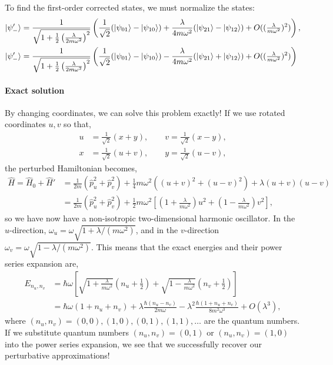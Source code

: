 \documentclass[10pt]{article}
\newcommand{\1}{\mathbf 1}
\begin{document}
To find the first-order corrected states, we must normalize the states:
\begin{align}
	\ket{\psi_-'}
	&=
	\frac{1}{\sqrt{
		1+
		\frac{1}{2}
		\left(
			\frac{\lambda}{2m \omega^2}
		\right)^2
	}}
	\left(
	\frac{1}{\sqrt{2}}
	(
		\ket{\psi_{01}}
		-
		\ket{\psi_{10}}
	)
	+
	\frac{\lambda}{4m \omega^2}
	(
		\ket{\psi_{21}}
		-
		\ket{\psi_{12}}
	)
	+
	O((\tfrac{\lambda}{m \omega^2})^2)
	\right),
	\\
	\ket{\psi_-'}
	&=
	\frac{1}{\sqrt{
		1+
		\frac{1}{2}
		\left(
			\frac{\lambda}{2m \omega^2}
		\right)^2
	}}
	\left(
	\frac{1}{\sqrt{2}}
	(
		\ket{\psi_{01}}
		-
		\ket{\psi_{10}}
	)
	-
	\frac{\lambda}{4m \omega^2}
	(
		\ket{\psi_{21}}
		+
		\ket{\psi_{12}}
	)
	+
	O((\tfrac{\lambda}{m \omega^2})^2)
	\right)
\end{align}


\paragraph{Exact solution}

By changing coordinates, we can solve this problem exactly!
If we use rotated coordinates $u,v$ so that,
\begin{align}
	u &= \frac{1}{\sqrt{2}}(x + y),
	\qquad
	v = \frac{1}{\sqrt{2}}(x - y),
	\\
	x &= \frac{1}{\sqrt{2}}(u + v),
	\qquad
	y = \frac{1}{\sqrt{2}}(u - v),
\end{align}
the perturbed Hamiltonian becomes,
\begin{align}
	\hat H
	=
	\hat H_0
	+
	\hat H'
	&=\nonumber
	\frac{1}{2m} ( \hat p_u^2 + \hat p_v^2)
	+
	\frac{1}{4} m \omega^2
	\left(
		(u+v)^2
		+
		(u-v)^2
	\right)
		+
	\lambda
	(u+v)
	(u-v)
	\\
	&=
	\frac{1}{2m} ( \hat p_u^2 + \hat p_v^2)
	+
	\frac{1}{2} m \omega^2
	\left[
		\left(
			1 + \frac{\lambda}{m \omega^2}
		\right)
		u^2
		+
		\left(
			1 - \frac{\lambda}{m \omega^2}
		\right)
		v^2
	\right],
\end{align}
so we have now have a non-isotropic two-dimensional harmonic oscillator.
In the $u$-direction, $\omega_u = \omega \sqrt{1+ \lambda/(m \omega^2)}$, and in the $v$-direction $\omega_v = \omega \sqrt{1- \lambda/(m \omega^2)}$.
This means that the exact energies and their power series expansion are,
\begin{align}
	E_{n_u,n_v}
	&=
	\hbar \omega
	\left[
		\sqrt{1+\frac{\lambda}{m \omega^2}}
		\left(
		n_u + \frac{1}{2}	
		\right)
		+
		\sqrt{1-\frac{\lambda}{m \omega^2}}
		\left(
		n_v + \frac{1}{2}	
		\right)
	\right]
	\\
	&=
	\hbar \omega 
	\left(
		1+ n_u + n_v
	\right)
	+
	\lambda
	\frac{\hbar (n_u - n_v)}{2 m \omega}
	-
	\lambda^2
	\frac{\hbar (1+ n_u + n_v)}{8 m^2 \omega^3}
	+ 
	O(\lambda^3)
	,
\end{align}
where $(n_u,n_v) = (0,0),(1,0),(0,1),(1,1),\dots$ are the quantum numbers.
If we substitute quantum numbers $(n_u,n_v) = (0,1)$ or  $(n_u,n_v) = (1,0)$ into the power series expansion, we see that we successfully recover our perturbative approximations!
\end{document}

